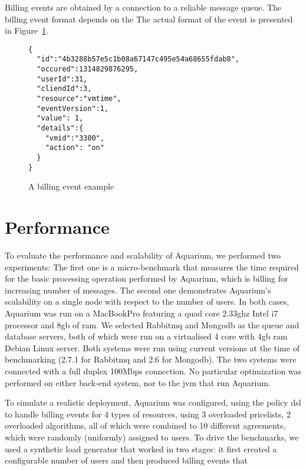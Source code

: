 \documentclass[preprint,10pt]{sigplanconf}
\begin{document}
Billing events are obtained by a connection to a reliable message queue.
The billing event format depends on the 
The actual format of the event is presented in Figure~\ref{fig:resevt}.

\begin{figure}
\lstset{language=C, basicstyle=\footnotesize,
stringstyle=\ttfamily, 
flexiblecolumns=true, aboveskip=-0.9em, belowskip=0em, lineskip=0em}

\begin{lstlisting}
{
  "id":"4b3288b57e5c1b08a67147c495e54a68655fdab8",
  "occured":1314829876295,
  "userId":31,
  "cliendId":3,
  "resource":"vmtime",
  "eventVersion":1,
  "value": 1,
  "details":{
    "vmid":"3300",
    "action": "on"
  }
}
\end{lstlisting}
\caption{A billing event example} 
\label{fig:resevt}

\end{figure}


\section{Performance}

To evaluate the performance and scalability of Aquarium, we performed two
experiments: The first one is a micro-benchmark that measures the time required
for the basic processing operation performed by Aquarium, which is billing for
increasing number of messages. The second one demonstrates Aquarium's
scalability on a single node with respect to the number of users.  In both
cases, Aquarium was run on a MacBookPro featuring a quad core 2.33{\sc g}hz
Intel i7 processor and 8{\sc gb} of {\sc ram}. We selected Rabbit{\sc mq} and
Mongo{\sc db} as the queue and database servers, both of which were run on a
virtualised 4 core with 4{\sc gb} {\sc ram} Debian Linux server. Both systems
were run using current versions at the time of benchmarking (2.7.1 for
Rabbit{\sc mq} and 2.6 for Mongo{\sc db}).  The two systems were connected with
a full duplex 100Mbps connection.  No particular optimization was performed on
either back-end system, nor to the {\sc jvm} that run Aquarium. 

To simulate a realistic deployment, Aquarium was configured, using the policy
{\sc dsl} to handle billing events for 4 types of resources, using 3 overloaded
pricelists, 2 overloaded algorithms, all of which were combined to 10 different
agreements, which were randomly (uniformly) assigned to users. To drive the
benchmarks, we used a synthetic load generator that worked in two stages: it
first created a configurable number of users and then produced billing events
that 
\end{document}
